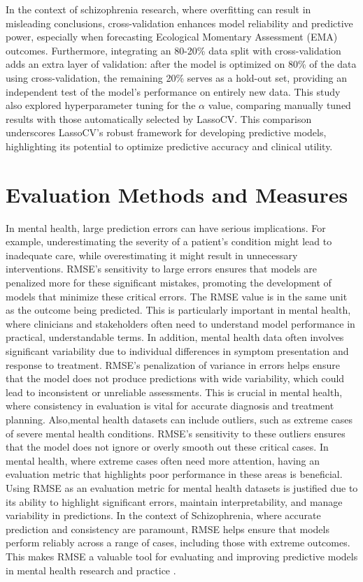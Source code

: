 In the context of schizophrenia research, where overfitting can result in misleading conclusions, cross-validation enhances model reliability and predictive power, especially when forecasting Ecological Momentary Assessment (EMA) outcomes. Furthermore, integrating an 80-20\% data split with cross-validation adds an extra layer of validation: after the model is optimized on 80\% of the data using cross-validation, the remaining 20\% serves as a hold-out set, providing an independent test of the model’s performance on entirely new data. This study also explored hyperparameter tuning for the \(\alpha\) value, comparing manually tuned results with those automatically selected by LassoCV. This comparison underscores LassoCV's robust framework for developing predictive models, highlighting its potential to optimize predictive accuracy and clinical utility. 

\section{Evaluation Methods and Measures}
In mental health, large prediction errors can have serious implications. For example, underestimating the severity of a patient's condition might lead to inadequate care, while overestimating it might result in unnecessary interventions. RMSE's sensitivity to large errors ensures that models are penalized more for these significant mistakes, promoting the development of models that minimize these critical errors. The RMSE value is in the same unit as the outcome being predicted. This is particularly important in mental health, where clinicians and stakeholders often need to understand model performance in practical, understandable terms. In addition, mental health data often involves significant variability due to individual differences in symptom presentation and response to treatment. RMSE’s penalization of variance in errors helps ensure that the model does not produce predictions with wide variability, which could lead to inconsistent or unreliable assessments. This is crucial in mental health, where consistency in evaluation is vital for accurate diagnosis and treatment planning. Also,mental health datasets can include outliers, such as extreme cases of severe mental health conditions. RMSE's sensitivity to these outliers ensures that the model does not ignore or overly smooth out these critical cases. In mental health, where extreme cases often need more attention, having an evaluation metric that highlights poor performance in these areas is beneficial. Using RMSE as an evaluation metric for mental health datasets is justified due to its ability to highlight significant errors, maintain interpretability, and manage variability in predictions. In the context of Schizophrenia,  where accurate prediction and consistency are paramount, RMSE helps ensure that models perform reliably across a range of cases, including those with extreme outcomes. This makes RMSE a valuable tool for evaluating and improving predictive models in mental health research and practice \citet{zhang2024students}.

